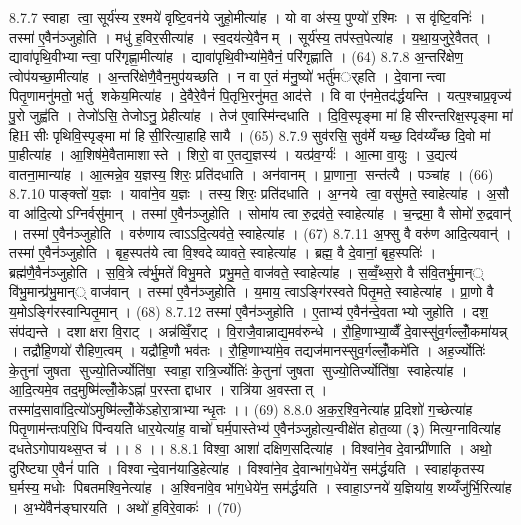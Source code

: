 8.7.7
स्वाहा त्वा॒ सूर्य॑स्य र॒श्मये॑ वृष्टि॒वन॑ये जुहो॒मीत्या॑ह । यो वा अ॑स्य॒ पुण्यो॑ र॒श्मिः । स वृ॑ष्टि॒वनिः॑ । तस्मा॑ ए॒वैन॑ञ्जुहोति । मधु॑ ह॒विर॒सीत्या॑ह । स्व॒दय॑त्ये॒वैनम् । सूर्य॑स्य॒ तप॑स्त॒पेत्या॑ह । य॒था॒य॒जुरे॒वैतत् । द्यावा॑पृथि॒वीभ्यान्त्वा॒ परि॑गृह्णा॒मीत्या॑ह । द्यावा॑पृथि॒वीभ्या॑मे॒वैनं॒ परि॑गृह्णाति । (64)
8.7.8
अ॒न्तरि॑क्षेण॒ त्वोप॑यच्छा॒मीत्या॑ह । अ॒न्तरि॑क्षेणै॒वैन॒मुप॑यच्छति । न वा ए॒तं म॑नु॒ष्यो॑ भर्तु॑मर््हति । दे॒वानान्त्वा पितृ॒णामनु॑मतो॒ भर्तु॑ शकेय॒मित्या॑ह । दे॒वैरे॒वैनं॑ पि॒तृभि॒रनु॑मत॒ आद॑त्ते । वि वा ए॑नमे॒तद॑र्द्धयन्ति । यत्प॒श्चाप्र॒वृज्य॑ पु॒रो जुह्व॑ति । तेजो॑ऽसि॒ तेजोऽनु॒ प्रेहीत्या॑ह । तेज॑ ए॒वास्मि॑न्दधाति । दि॒वि॒स्पृङ्मा मा॑ हिसीरन्तरिक्ष॒स्पृङ्मा मा॑ हिHसीः पृथिवि॒स्पृङ्मा मा॑ हिसी॒रित्या॒हाहि॑सायै । (65)
8.7.9
सुव॑रसि॒ सुव॑र्मे यच्छ॒ दिव॑य्यँच्छ दि॒वो मा॑ पा॒हीत्या॑ह । आ॒शिष॑मे॒वैतामाशास्ते । शिरो॒ वा ए॒तद्य॒ज्ञस्य॑ । यत्प्र॑व॒र्ग्यः॑ । आ॒त्मा वा॒युः । उ॒द्यत्य॑ वातना॒मान्या॑ह । आ॒त्मन्ने॒व य॒ज्ञस्य॒ शिरः॒ प्रति॑दधाति । अन॑वानम् । प्रा॒णाना॒॒ सन्त॑त्यै । पञ्चा॑ह । (66)
8.7.10
पाङ्क्तो॑ य॒ज्ञः । यावा॑ने॒व य॒ज्ञः । तस्य॒ शिरः॒ प्रति॑दधाति । अ॒ग्नये त्वा॒ वसु॑मते॒ स्वाहेत्या॑ह । अ॒सौ वा आ॑दि॒त्योऽग्निर्वसु॑मान् । तस्मा॑ ए॒वैन॑ञ्जुहोति । सोमा॑य त्वा रु॒द्रव॑ते॒ स्वाहेत्या॑ह । च॒न्द्रमा॒ वै सोमो॑ रु॒द्रवान्॑ । तस्मा॑ ए॒वैन॑ञ्जुहोति । वरु॑णाय त्वाऽऽदि॒त्यव॑ते॒ स्वाहेत्या॑ह । (67)
8.7.11
अ॒फ्सु वै वरु॑ण आदि॒त्यवान्॑ । तस्मा॑ ए॒वैन॑ञ्जुहोति । बृह॒स्पत॑ये त्वा वि॒श्वदेव्यावते॒ स्वाहेत्या॑ह । ब्रह्म॒ वै दे॒वानां॒ बृह॒स्पतिः॑ । ब्रह्म॑णै॒वैन॑ञ्जुहोति । स॒वि॒त्रे त्व॑र्भु॒मते॑ विभु॒मते प्रभु॒मते॒ वाज॑वते॒ स्वाहेत्या॑ह । स॒व्वँ॒थ्स॒रो वै स॑वि॒तर्भु॒मान्् वि॑भु॒मान्प्र॑भु॒मान्् वाज॑वान् । तस्मा॑ ए॒वैन॑ञ्जुहोति । य॒माय॒ त्वाऽङ्गि॑रस्वते पितृ॒मते॒ स्वाहेत्या॑ह । प्रा॒णो वै य॒मोऽङ्गि॑रस्वान्पितृ॒मान् । (68)
8.7.12
तस्मा॑ ए॒वैन॑ञ्जुहोति । ए॒ताभ्य॑ ए॒वैन॑न्दे॒वताभ्यो जुहोति । दश॒ संप॑द्यन्ते । दशाक्षरा वि॒राट् । अन्न॑व्विँ॒राट् । वि॒राजै॒वान्नाद्य॒मव॑रुन्धे । रौ॒हि॒णाभ्या॒व्वैँ दे॒वास्सु॑व॒र्गल्लोँ॒कमा॑यन्न् । तद्रौ॑हि॒णयो॑ रौहिण॒त्वम् । यद्रौ॑हि॒णौ भव॑तः । रौ॒हि॒णाभ्या॑मे॒व तद्यज॑मानस्सुव॒र्गल्लोँ॒कमे॑ति । अह॒र्ज्योतिः॑ के॒तुना॑ जुषता सुज्यो॒तिर्ज्योति॑षा॒॒ स्वाहा॒ रात्रि॒र्ज्योतिः॑ के॒तुना॑ जुषता सुज्यो॒तिर्ज्योति॑षा॒॒ स्वाहेत्या॑ह । आ॒दि॒त्यमे॒व तद॒मुष्मि॑ल्लोँ॒केऽह्ना॑ प॒रस्ताद्दाधार । रात्रि॑या अ॒वस्तात् । तस्मा॑द॒सावा॑दि॒त्यो॑ऽमुष्मि॑ल्लोँ॒के॑ऽहोरा॒त्राभ्यान्धृ॒तः ।। (69)
8.8.0
अ॒क॒र॒श्वि॒नेत्या॑ह प्र॒दिशो॑ ग॒च्छेत्या॑ह पितृ॒णाम॑न्तःपरि॒धि पि॑न्वयति धार॒येत्या॑ह॒ वाचो॑ घर्म॒पास्तेभ्य॑ ए॒वैन॑ञ्जुहोत्य॒न्वीक्षे॑त होत॒व्या (३) मित्य॒ग्नावित्या॑ह दधतेऽगोपायथ्स॒प्त च॑ ।। 8 ।।
8.8.1
विश्वा॒ आशा॑ दक्षिण॒सदित्या॑ह । विश्वा॑ने॒व दे॒वान्प्री॑णाति । अथो॒ दुरि॑ष्ट्या ए॒वैनं॑ पाति । विश्वान्दे॒वान॑याडि॒हेत्या॑ह । विश्वा॑ने॒व दे॒वान्भा॑ग॒धेये॑न॒ सम॑र्द्धयति । स्वाहा॑कृतस्य घ॒र्मस्य॒ मधोः पिबतमश्वि॒नेत्या॑ह । अ॒श्विना॑वे॒व भा॑ग॒धेये॑न॒ सम॑र्द्धयति । स्वाहा॒ऽग्नये॑ य॒ज्ञिया॑य॒ शय्यँजु॑र्भि॒रित्या॑ह । अ॒भ्ये॑वैन॑ङ्घारयति । अथो॑ ह॒विरे॒वाकः॑ । (70)
